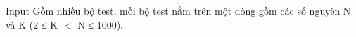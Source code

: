 Input
Gồm nhiều bộ test, mỗi bộ test nằm trên một dòng gồm các số nguyên N và K (2 ≤ K $<$ N ≤ 1000).